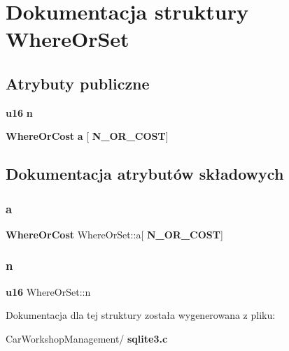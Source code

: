 \section{Dokumentacja struktury Where\+Or\+Set}
\label{struct_where_or_set}
\subsection*{Atrybuty publiczne}
\begin{DoxyCompactItemize}
\item 
\textbf{ u16} \textbf{ n}
\item 
\textbf{ Where\+Or\+Cost} \textbf{ a} [\textbf{ N\+\_\+\+O\+R\+\_\+\+C\+O\+ST}]
\end{DoxyCompactItemize}


\subsection{Dokumentacja atrybutów składowych}
\mbox{\label{struct_where_or_set_a2e78a14bf6f34f266a2ae2d046c7ba80}} 
\subsubsection{a}
{\footnotesize\ttfamily \textbf{ Where\+Or\+Cost} Where\+Or\+Set\+::a[\textbf{ N\+\_\+\+O\+R\+\_\+\+C\+O\+ST}]}

\mbox{\label{struct_where_or_set_ac5fce5cb06eb3e01a77efe6643acd618}} 
\subsubsection{n}
{\footnotesize\ttfamily \textbf{ u16} Where\+Or\+Set\+::n}



Dokumentacja dla tej struktury została wygenerowana z pliku\+:\begin{DoxyCompactItemize}
\item 
Car\+Workshop\+Management/\textbf{ sqlite3.\+c}\end{DoxyCompactItemize}
